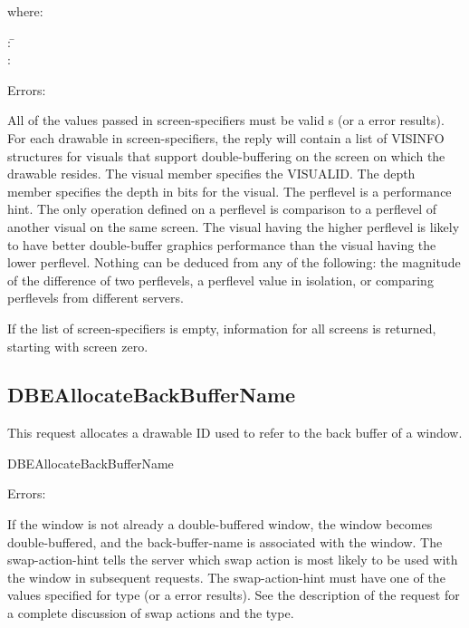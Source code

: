 where:
\begin{tabbing}
: \= \\
: \> [ \= \typeargname{visual}: \typename{VISUALID}\\
			\>\> \typeargname{depth}: \typename{CARD8}\\
			\>\> \typeargname{perflevel}: \typename{CARD8} ]
\end{tabbing}
%
Errors: 

All of the values passed in screen-specifiers must be valid
s (or a  error results).  For each drawable
in screen-specifiers, the reply will contain a list of
VISINFO structures for visuals that support double-buffering on the
screen on which the drawable resides.  The visual member
specifies the VISUALID\@.  The depth member specifies the
depth in bits for the visual.  The perflevel is a
performance hint.  The only operation defined on a perflevel
is comparison to a perflevel of another visual on the same
screen.  The visual having the higher perflevel is likely to
have better double-buffer graphics performance than the visual having
the lower perflevel.  Nothing can be deduced from any of the
following: the magnitude of the difference of two
perflevels, a perflevel value in isolation, or
comparing perflevels from different servers.

If the list of screen-specifiers is empty, information for
all screens is returned, starting with screen zero.

\subsection{DBEAllocateBackBufferName}

This request allocates a drawable ID used to refer to the back buffer of a
window.

\begin{arequest}{DBEAllocateBackBufferName}
\end{arequest}

Errors: 

If the window is not already a double-buffered window, the
window becomes double-buffered, and the back-buffer-name is
associated with the window.  The swap-action-hint tells the
server which swap action is most likely to be used with the window in
subsequent  requests.  The
swap-action-hint must have one of the values specified for
type  (or a  error results).  See the
description of the  request for a complete
discussion of swap actions and the  type.

